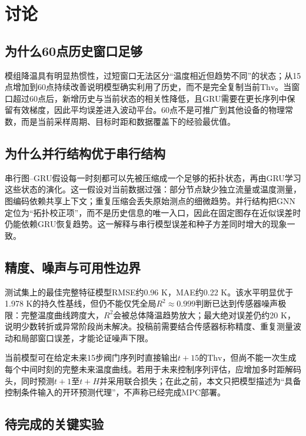 \documentclass[a4paper,fleqn]{cas-dc}
\newcommand{\Thv}{\mathrm{Thv}}
\begin{document}
\section{讨论}\label{sec:discussion}

\subsection{为什么60点历史窗口足够}

模组降温具有明显热惯性，过短窗口无法区分“温度相近但趋势不同”的状态；从15点增加到60点持续改善说明模型确实利用了历史，而不是完全复制当前$\Thv$。当窗口超过60点后，新增历史与当前状态的相关性降低，且GRU需要在更长序列中保留有效梯度，因此平均误差进入波动平台。60点不是可推广到其他设备的物理常数，而是当前采样周期、目标时距和数据覆盖下的经验最优值。

\subsection{为什么并行结构优于串行结构}

串行图--GRU假设每一时刻都可以先被压缩成一个足够的拓扑状态，再由GRU学习这些状态的演化。这一假设对当前数据过强：部分节点缺少独立流量或温度测量，图编码依赖共享上下文；重复压缩会丢失原始测点的细微趋势。并行结构把GNN定位为“拓扑校正项”，而不是历史信息的唯一入口，因此在固定图存在近似误差时仍能依赖GRU恢复趋势。这一解释与串行模型误差和种子方差同时增大的现象一致。

\subsection{精度、噪声与可用性边界}

测试集上的最佳完整特征模型RMSE约0.96 K，MAE约0.22 K。该水平明显优于1.978 K的持久性基线，但仍不能仅凭全局$R^2\approx0.999$判断已达到传感器噪声极限：完整温度曲线跨度大，$R^2$会被总体降温趋势放大；最大绝对误差仍约20 K，说明少数转折或异常阶段尚未解决。投稿前需要结合传感器标称精度、重复测量波动和局部窗口误差，才能论证噪声下限。

当前模型可在给定未来15步阀门序列时直接输出$t+15$的$\Thv$，但尚不能一次生成每个中间时刻的完整未来温度曲线。若用于未来控制序列评估，应增加多时距解码头，同时预测$t+1$至$t+H$并采用联合损失；在此之前，本文只把模型描述为“具备控制条件输入的开环预测代理”，不声称已经完成MPC部署。

\subsection{待完成的关键实验}
\end{document}
